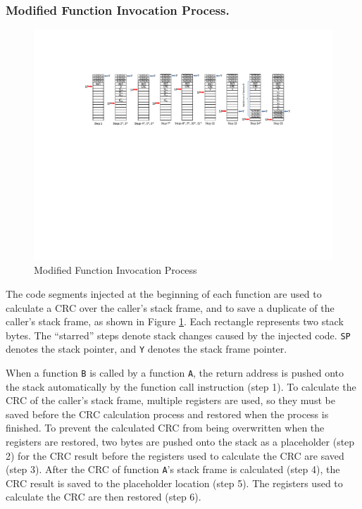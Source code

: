 \subsubsection{Modified Function Invocation Process.}
\vspace{-15pt}
\begin{figure}[h]
	\centering
	\includegraphics[width=1.0\textwidth]{figures/modified_function_operations_stack_pre_execution_v3}
	\vspace{-15pt}
	\caption{Modified Function Invocation Process}\label{fig:modified_function_operation_pre_execution}
\end{figure}
\vspace{-20pt}
The code segments injected at the beginning of each function are used to calculate a CRC over the caller's stack frame, and to save a duplicate of the caller's stack frame, as shown in Figure \ref{fig:modified_function_operation_pre_execution}. Each rectangle represents two stack bytes. The ``starred'' steps denote stack changes caused by the injected code. \texttt{SP} denotes the stack pointer, and \texttt{Y} denotes the stack frame pointer.

When a function \texttt{B} is called by a function \texttt{A}, the return address is pushed onto the stack automatically by the function call instruction (step 1). To calculate the CRC of the caller's stack frame, multiple registers are used, so they must be saved before the CRC calculation process and restored when the process is finished. To prevent the calculated CRC from being overwritten when the registers are restored, two bytes are pushed onto the stack as a placeholder (step 2) for the CRC result before the registers used to calculate the CRC are saved (step 3). After the CRC of function \texttt{A}'s stack frame is calculated (step 4), the CRC result is saved to the placeholder location (step 5). The registers used to calculate the CRC are then restored (step 6).

